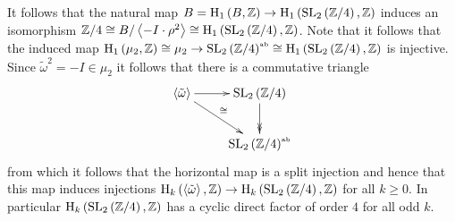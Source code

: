 \documentclass[12pt]{amsart}
\theoremstyle{definition}
\newcommand{\Z}{\Bbb{Z}}
\newcommand{\spl}[2]{\operatorname{SL}_{#1}\left(#2\right)}
\newcommand{\<}{\langle}
\renewcommand{\>}{\rangle}
\newcommand{\an}[1]{\left\langle{#1}\right\rangle}
\newcommand{\gab}[1]{{#1}^{\mbox{\tiny{ab}}}}%
\newcommand{\ho}[3]{\mathrm{H}_{#1}\left( #2,#3 \right)}
\begin{document}
It follows that the natural map $B=\ho{1}{B}{\Z}\to \ho{1}{\spl{2}{\Z/4}}{\Z}$ induces an isomorphism $\Z/4\cong B/\an{-I\cdot\rho^2}\cong\ho{1}{\spl{2}{\Z/4}}{\Z}$. Note that it follows that the induced map $\ho{1}{\mu_2}{\Z}\cong\mu_2\to\gab{\spl{2}{\Z/4}}\cong \ho{1}{\spl{2}{\Z/4}}{\Z}$ is injective. Since $\tilde{\omega}^2=-I\in\mu_2$ it follows that there is a commutative triangle
\[
\xymatrix{
\an{\tilde{\omega}}\ar[r]\ar^-{\cong}[rd]&\spl{2}{\Z/4}\ar@{>>}[d]\\
&\gab{\spl{2}{\Z/4}}\\
}
\]
from which it follows that the horizontal map is a split injection and hence that this map induces injections $\ho{k}{\an{\tilde{\omega}}}{\Z}\to\ho{k}{\spl{2}{\Z/4}}{\Z}$ for all $k\geq 0$.
In particular $\ho{k}{\spl{2}{\Z/4}}{\Z}$ has a cyclic direct factor of order $4$ for all odd $k$.
\end{document}
